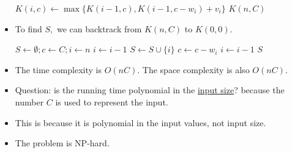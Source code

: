 \documentclass[a4paper,12pt]{article}
\begin{document}
\begin{itemize}
\begin{algorithmic}[1]
                    \State $K(i,c)\gets \max\{K(i-1,c),K(i-1,c-w_i)+v_i\}$
                \EndIf
            \EndFor
        \EndFor
        \State \Return $K(n,C)$
        \EndProcedure
    \end{algorithmic}
    \item To find $S,$ we can backtrack from $K(n,C)$ to $K(0,0).$ \begin{algorithmic}[1]
        \State $S\gets\emptyset;c\gets C;i\gets n$
                \State $i\gets i-1$
            \Else
                \State $S\gets S\cup\{i\}$
                \State $c\gets c-w_i$
                \State $i\gets i-1$
            \EndIf
        \EndWhile
        \State \Return $S$
        \EndProcedure
    \end{algorithmic}
    \item The time complexity is $O(nC).$ The space complexity is also $O(nC).$
    \item Question: is the running time polynomial in the \underline{input size}?  because the number $C$ is  used to represent the input.
    \item This is  because it is polynomial in the input values, not input size.
    \item The problem is NP-hard.
\end{itemize}
\end{document}
